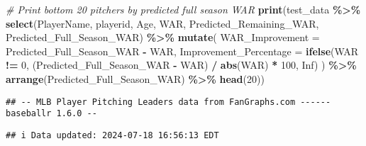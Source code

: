 \documentclass[
]{article}
\newenvironment{Shaded}{\begin{snugshade}}{\end{snugshade}}
\newcommand{\AttributeTok}[1]{\textcolor[rgb]{0.13,0.29,0.53}{#1}}
\newcommand{\CommentTok}[1]{\textcolor[rgb]{0.56,0.35,0.01}{\textit{#1}}}
\newcommand{\ConstantTok}[1]{\textcolor[rgb]{0.56,0.35,0.01}{#1}}
\newcommand{\DecValTok}[1]{\textcolor[rgb]{0.00,0.00,0.81}{#1}}
\newcommand{\FunctionTok}[1]{\textcolor[rgb]{0.13,0.29,0.53}{\textbf{#1}}}
\newcommand{\NormalTok}[1]{#1}
\newcommand{\SpecialCharTok}[1]{\textcolor[rgb]{0.81,0.36,0.00}{\textbf{#1}}}
\begin{document}
\begin{Shaded}
\begin{Highlighting}[]
\CommentTok{\# Print bottom 20 pitchers by predicted full season WAR}
\FunctionTok{print}\NormalTok{(test\_data }\SpecialCharTok{\%\textgreater{}\%} 
        \FunctionTok{select}\NormalTok{(PlayerName, playerid, Age, WAR, Predicted\_Remaining\_WAR, Predicted\_Full\_Season\_WAR) }\SpecialCharTok{\%\textgreater{}\%} 
        \FunctionTok{mutate}\NormalTok{(}
          \AttributeTok{WAR\_Improvement =}\NormalTok{ Predicted\_Full\_Season\_WAR }\SpecialCharTok{{-}}\NormalTok{ WAR,}
          \AttributeTok{Improvement\_Percentage =} \FunctionTok{ifelse}\NormalTok{(WAR }\SpecialCharTok{!=} \DecValTok{0}\NormalTok{, (Predicted\_Full\_Season\_WAR }\SpecialCharTok{{-}}\NormalTok{ WAR) }\SpecialCharTok{/} \FunctionTok{abs}\NormalTok{(WAR) }\SpecialCharTok{*} \DecValTok{100}\NormalTok{, }\ConstantTok{Inf}\NormalTok{)}
\NormalTok{        ) }\SpecialCharTok{\%\textgreater{}\%}
        \FunctionTok{arrange}\NormalTok{(Predicted\_Full\_Season\_WAR) }\SpecialCharTok{\%\textgreater{}\%}
        \FunctionTok{head}\NormalTok{(}\DecValTok{20}\NormalTok{))}
\end{Highlighting}
\end{Shaded}

\begin{verbatim}
## -- MLB Player Pitching Leaders data from FanGraphs.com ------ baseballr 1.6.0 --
\end{verbatim}

\begin{verbatim}
## i Data updated: 2024-07-18 16:56:13 EDT
\end{verbatim}
\end{document}
